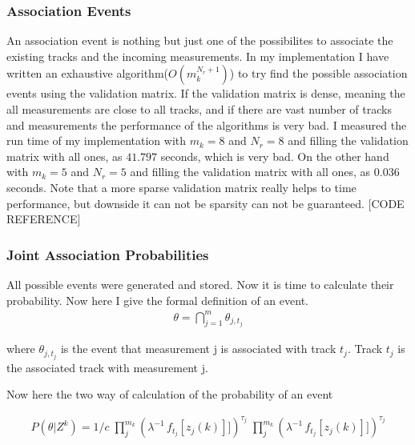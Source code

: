 \documentclass[peerreview]{IEEEtran}
\begin{document}
\vspace{10px}

\subsubsection{Association Events}
An association event is nothing but just one of the possibilites to associate the existing tracks and the incoming measurements. In my implementation I have written an exhaustive algorithm($O(m_k^{N_r+1})$) to try find the possible association events using the validation matrix. If the validation matrix is dense, meaning the all measurements are close to all tracks, and if there are vast number of tracks and measurements the performance of the algorithms is very bad. I measured the run time of my implementation with $m_k = 8$ and $N_r = 8$ and filling the validation matrix with all ones, as $41.797$ seconds, which is very bad. On the other hand with $m_k = 5$ and $N_r = 5$ and filling the validation matrix with all ones, as $0.036$ seconds. Note that a more sparse validation matrix really helps to time performance, but downside it can not be sparsity can not be guaranteed. [CODE REFERENCE]

\vspace{10px}

\subsubsection{Joint Association Probabilities}
All possible events were generated and stored. Now it is time to calculate their probability. Now here I give the formal definition of an event.
\begin{equation}
\begin{aligned}
\theta = \bigcap\limits_{j=1}^m \theta_{j,t_j}
\end{aligned}
\end{equation}

where $\theta_{j,t_j}$ is the event that measurement j is associated with track $t_j$. Track $t_j$ is the associated track with measurement j.

Now here the two way of calculation of the probability of an event

\begin{equation}
\begin{aligned}
P(\theta|Z^k) = 1/c \; \prod\limits_j^{m_k}( \lambda^{-1} \, f_{t_j}[z_j(k)]] )^{\tau_j} \; \prod\limits_j^{m_k}( \lambda^{-1} \, f_{t_j}[z_j(k)]] )^{\tau_j}
\end{aligned}
\end{equation}
\end{document}
